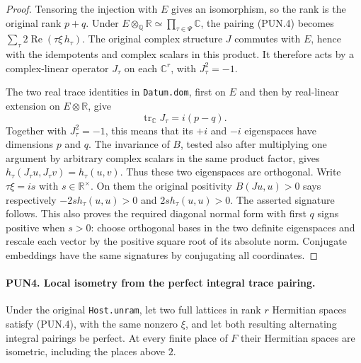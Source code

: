 \documentclass[11pt,a4paper]{article}
\numberwithin{equation}{section}
\theoremstyle{remark}\newtheorem{remark}[theorem]{Remark}
\begin{document}
\begin{proof}
Tensoring the injection with \(E\) gives an isomorphism, so the
rank is the original rank \(p+q\).  Under
\(E\otimes_{\mathbb Q}\mathbb R\simeq\prod_{\tau\in\Psi}\mathbb C\),
the pairing (PUN.4) becomes
\(\sum_\tau2\operatorname{Re}(\tau\xi\,h_\tau)\).
The original complex structure \(J\) commutes with \(E\), hence
with the idempotents and complex scalars in this product.  It
therefore acts by a complex-linear operator \(J_\tau\) on each
\(\mathbb C^r\), with \(J_\tau^2=-1\).

The two real trace identities in \texttt{Datum.\allowbreak dom}, first on
\(E\) and then by real-linear extension on
\(E\otimes\mathbb R\), give
\[
 \operatorname{tr}_{\mathbb C}J_\tau=i(p-q).
 \tag{PUN.5}
\]
Together with \(J_\tau^2=-1\), this means that its \(+i\) and
\(-i\) eigenspaces have dimensions \(p\) and \(q\).
The invariance of \(B\), tested also after multiplying one argument
by arbitrary complex scalars in the same product factor, gives
\(h_\tau(J_\tau u,J_\tau v)=h_\tau(u,v)\).  Thus these two
eigenspaces are orthogonal.  Write \(\tau\xi=is\) with
\(s\in\mathbb R^\times\).  On them the original positivity
\(B(Ju,u)>0\) says respectively
\(-2s h_\tau(u,u)>0\) and \(2s h_\tau(u,u)>0\).
The asserted signature follows.  This also proves the required
diagonal normal form with first \(q\) signs positive when \(s>0\):
choose orthogonal bases in the two definite eigenspaces and rescale
each vector by the positive square root of its absolute norm.
Conjugate embeddings have the same signatures by conjugating all
coordinates.
\end{proof}

\paragraph{PUN4. Local isometry from the perfect integral trace pairing.}
\label{claim:PUN4}
Under the original \texttt{Host.\allowbreak unram}, let two full lattices in
rank \(r\) Hermitian spaces satisfy (PUN.4), with the same nonzero
\(\xi\), and let both resulting alternating integral pairings be
perfect.  At every finite place of \(F\) their Hermitian spaces
are isometric, including the places above \(2\).
\end{document}
